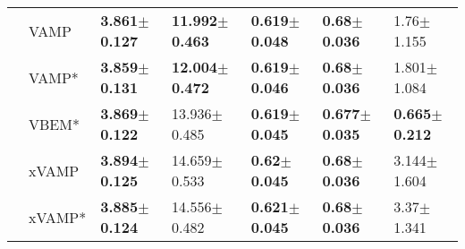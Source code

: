 \begin{tabular}{lllllll}
             & VAMP &  \textbf{3.861$\pm$0.127} &  \textbf{11.992$\pm$0.463} &  \textbf{0.619$\pm$0.048} &   \textbf{0.68$\pm$0.036} &            1.76$\pm$1.155 \\
             & VAMP* &  \textbf{3.859$\pm$0.131} &  \textbf{12.004$\pm$0.472} &  \textbf{0.619$\pm$0.046} &   \textbf{0.68$\pm$0.036} &           1.801$\pm$1.084 \\
             & VBEM* &  \textbf{3.869$\pm$0.122} &           13.936$\pm$0.485 &  \textbf{0.619$\pm$0.045} &  \textbf{0.677$\pm$0.035} &  \textbf{0.665$\pm$0.212} \\
             & xVAMP &  \textbf{3.894$\pm$0.125} &           14.659$\pm$0.533 &   \textbf{0.62$\pm$0.045} &   \textbf{0.68$\pm$0.036} &           3.144$\pm$1.604 \\
             & xVAMP* &  \textbf{3.885$\pm$0.124} &           14.556$\pm$0.482 &  \textbf{0.621$\pm$0.045} &   \textbf{0.68$\pm$0.036} &            3.37$\pm$1.341 \\
\bottomrule
\end{tabular}

